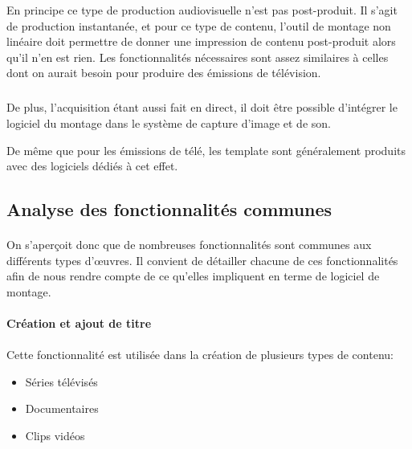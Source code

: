 En principe ce type de production audiovisuelle n'est pas post-produit. Il
s'agit de production instantanée, et pour ce type de contenu, l'outil
de montage non linéaire doit permettre de donner une impression de
contenu post-produit alors qu'il n'en est rien. Les fonctionnalités
nécessaires sont assez similaires à celles dont on aurait besoin pour
produire des émissions de télévision.

\subparagraph{}

De plus, l'acquisition étant aussi fait en direct, il doit être possible
d'intégrer le logiciel du montage dans le système de capture d'image
et de son.

De même que pour les émissions de télé, les template sont
généralement produits avec des logiciels dédiés à cet effet.

\subsection{Analyse des fonctionnalités communes}

\paragraph{}

On s'aperçoit donc que de nombreuses fonctionnalités sont communes aux
différents types d'œuvres. Il convient de détailler chacune de ces
fonctionnalités afin de nous rendre compte de ce qu'elles impliquent
en terme de logiciel de montage.

\paragraph{Création et ajout de titre}

\paragraph{}

Cette fonctionnalité est utilisée dans la création de plusieurs types
de contenu:

\begin{itemize} \setlength{\itemsep}{2mm}

  \item {Séries télévisés}

  \item {Documentaires}

  \item {Clips vidéos}

\end{itemize}

